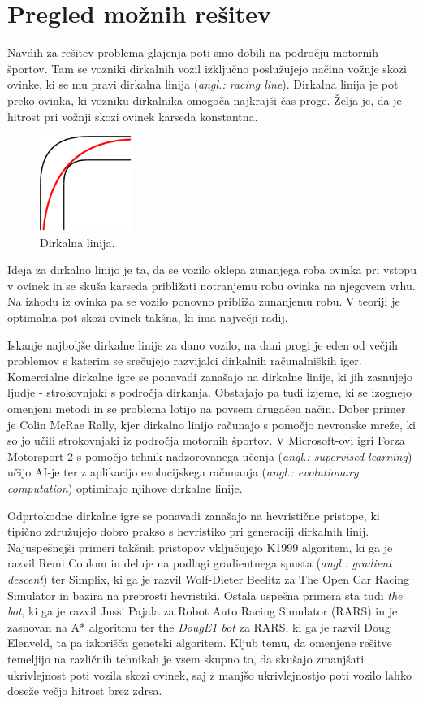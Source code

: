 \documentclass[10pt,a4paper]{article}
\begin{document}
\section{Pregled možnih rešitev}

Navdih za rešitev problema glajenja poti smo dobili na področju motornih športov. Tam se vozniki dirkalnih vozil izključno poslužujejo načina vožnje skozi ovinke, ki se mu pravi dirkalna linija (\textit{angl.: racing line}). Dirkalna linija je pot preko ovinka, ki vozniku dirkalnika omogoča najkrajši čas proge. Želja je, da je hitrost pri vožnji skozi ovinek karseda konstantna.

\begin{figure}[H]
	\centering
	\includegraphics[width=3cm]{pic/slika4.png}
	\caption{Dirkalna linija.}
	\label{fig:slika}
\end{figure}

Ideja za dirkalno linijo je ta, da se vozilo oklepa zunanjega roba ovinka pri vstopu v ovinek in se skuša karseda približati notranjemu robu ovinka na njegovem vrhu. Na izhodu iz ovinka pa se vozilo ponovno približa zunanjemu robu. V teoriji je optimalna pot skozi ovinek takšna, ki ima največji radij.

Iskanje najboljše dirkalne linije za dano vozilo, na dani progi je eden od večjih problemov s katerim se srečujejo razvijalci dirkalnih računalniških iger. Komercialne dirkalne igre se ponavadi zanašajo na dirkalne linije, ki jih zasnujejo ljudje - strokovnjaki s področja dirkanja. Obstajajo pa tudi izjeme, ki se izognejo omenjeni metodi in se problema lotijo na povsem drugačen način. Dober primer je Colin McRae Rally, kjer dirkalno linijo računajo s pomočjo nevronske mreže, ki so jo učili strokovnjaki iz področja motornih športov. V Microsoft-ovi igri Forza Motorsport 2 s pomočjo tehnik nadzorovanega učenja (\textit{angl.: supervised learning}) učijo AI-je ter z aplikacijo evolucijskega računanja (\textit{angl.: evolutionary computation}) optimirajo njihove dirkalne linije.

Odprtokodne dirkalne igre se ponavadi zanašajo na hevristične pristope, ki tipično združujejo dobro prakso s hevristiko pri generaciji dirkalnih linij. Najuspešnejši primeri takšnih pristopov vključujejo K1999 algoritem, ki ga je razvil Remi Coulom in deluje na podlagi gradientnega spusta (\textit{angl.: gradient descent}) ter Simplix, ki ga je razvil Wolf-Dieter Beelitz za The Open Car Racing Simulator in bazira na preprosti hevristiki. Ostala uspešna primera sta tudi \textit{the bot}, ki ga je razvil Jussi Pajala za Robot Auto Racing Simulator (RARS) in je zasnovan na A* algoritmu ter the \textit{DougE1 bot} za RARS, ki ga je razvil Doug Elenveld, ta pa izkorišča genetski algoritem. Kljub temu, da omenjene rešitve temeljijo na različnih tehnikah je vsem skupno to, da skušajo zmanjšati ukrivlejnost poti vozila skozi ovinek, saj z manjšo ukrivlejnostjo poti vozilo lahko doseže večjo hitrost brez zdrsa.
\end{document}
